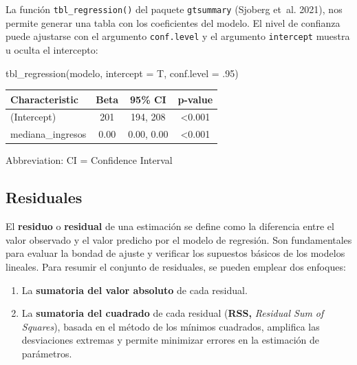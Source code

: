 \documentclass[
  spanish,
  a4paper,
]{scrbook}
\newenvironment{Shaded}{\begin{snugshade}}{\end{snugshade}}
\newcommand{\AttributeTok}[1]{\textcolor[rgb]{0.40,0.45,0.13}{#1}}
\newcommand{\DecValTok}[1]{\textcolor[rgb]{0.68,0.00,0.00}{#1}}
\newcommand{\FunctionTok}[1]{\textcolor[rgb]{0.28,0.35,0.67}{#1}}
\newcommand{\NormalTok}[1]{\textcolor[rgb]{0.00,0.23,0.31}{#1}}
\begin{document}
La función \texttt{tbl\_regression()} del paquete \texttt{gtsummary}
(Sjoberg et~al. 2021), nos permite generar una tabla con los
coeficientes del modelo. El nivel de confianza puede ajustarse con el
argumento \texttt{conf.level} y el argumento \texttt{intercept} muestra
u oculta el intercepto:

\begin{Shaded}
\begin{Highlighting}[]
\FunctionTok{tbl\_regression}\NormalTok{(modelo, }\AttributeTok{intercept =}\NormalTok{ T, }\AttributeTok{conf.level =}\NormalTok{ .}\DecValTok{95}\NormalTok{)}
\end{Highlighting}
\end{Shaded}

\begin{table}
\fontsize{12.0pt}{14.0pt}\selectfont
\begin{tabular*}{\linewidth}{@{\extracolsep{\fill}}lccc}
\toprule
\textbf{Characteristic} & \textbf{Beta} & \textbf{95\% CI} & \textbf{p-value} \\ 
\midrule\addlinespace[2.5pt]
(Intercept) & 201 & 194, 208 & <0.001 \\ 
mediana\_ingresos & 0.00 & 0.00, 0.00 & <0.001 \\ 
\bottomrule
\end{tabular*}
\begin{minipage}{\linewidth}
\vspace{.05em}
Abbreviation: CI = Confidence Interval\\
\end{minipage}
\end{table}

\subsection{Residuales}\label{residuales}

El \textbf{residuo} o \textbf{residual} de una estimación se define como
la diferencia entre el valor observado y el valor predicho por el modelo
de regresión. Son fundamentales para evaluar la bondad de ajuste y
verificar los supuestos básicos de los modelos lineales. Para resumir el
conjunto de residuales, se pueden emplear dos enfoques:

\begin{enumerate}
\def\labelenumi{\arabic{enumi}.}
\item
  La \textbf{sumatoria del valor absoluto} de cada residual.
\item
  La \textbf{sumatoria del cuadrado} de cada residual (\textbf{RSS,}
  \emph{Residual Sum of Squares}), basada en el método de los mínimos
  cuadrados, amplifica las desviaciones extremas y permite minimizar
  errores en la estimación de parámetros.
\end{enumerate}
\end{document}
